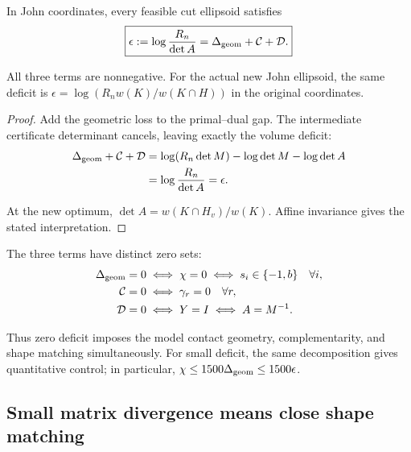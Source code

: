 \begin{proposition}\label{prop-gap}
In John coordinates, every feasible cut ellipsoid satisfies
\begin{equation}\label{eq:4.3}
\boxed{\epsilon:=\log\frac{R_n}{\det A}
=\Delta_{\rm geom}+\mathcal C+\mathcal D.}
\end{equation}

All three terms are nonnegative. For the actual new John ellipsoid, the same deficit is $\epsilon=\log(R_nw(K)/w(K\cap H))$ in the original coordinates.

\end{proposition}

\begin{proof}
Add the geometric loss to the primal--dual gap. The intermediate
certificate determinant cancels, leaving exactly the volume deficit:
\begin{equation}\label{eq:4.4}
\begin{aligned}
\Delta_{\rm geom}+\mathcal C+\mathcal D
&=\log(R_n\det M)-\log\det M-\log\det A\\
&=\log\frac{R_n}{\det A}=\epsilon.
\end{aligned}
\end{equation}

At the new optimum, $\det A=w(K\cap H_v)/w(K)$. Affine invariance gives the stated interpretation. 
\end{proof}

The three terms have distinct zero sets:
\begin{equation}\label{eq:4.5}
\begin{aligned}
\Delta_{\rm geom}=0&\iff\chi=0\iff s_i\in\{-1,b\}\quad\forall i,\\
\mathcal C=0&\iff\gamma_r=0\quad\forall r,\\
\mathcal D=0&\iff Y=I\iff A=M^{-1}.
\end{aligned}
\end{equation}

Thus zero deficit imposes the model contact geometry, complementarity, and shape matching simultaneously. For small deficit, the same decomposition gives quantitative control; in particular, $\chi\le1500\Delta_{\rm geom}\le1500\epsilon$.

\subsection{Small matrix divergence means close shape matching}\label{sec:4.3}

